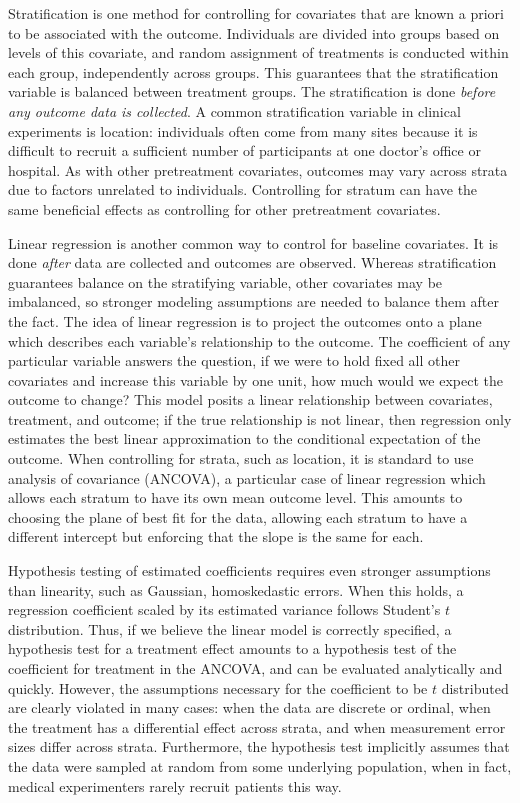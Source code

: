 \documentclass[11pt]{article}
\begin{document}
Stratification is one method for controlling for covariates that are known a priori to be associated with the outcome.
Individuals are divided into groups based on levels of this covariate, and random assignment of treatments is conducted within each group, independently across groups.
This guarantees that the stratification variable is balanced between treatment groups.
The stratification is done \textit{before any outcome data is collected}.
A common stratification variable in clinical experiments is location:
individuals often come from many sites because it is difficult to recruit a sufficient number of participants at one doctor's office or hospital.
As with other pretreatment covariates, outcomes may vary across strata due to factors unrelated to individuals.
Controlling for stratum can have the same beneficial effects as controlling for other pretreatment covariates.

Linear regression is another common way to control for baseline covariates.
It is done \textit{after} data are collected and outcomes are observed.
Whereas stratification guarantees balance on the stratifying variable, other covariates may be imbalanced, so stronger modeling assumptions are needed to balance them after the fact.
The idea of linear regression is to project the outcomes onto a plane which describes each variable's relationship to the outcome.
The coefficient of any particular variable answers the question, if we were to hold fixed all other covariates and increase this variable by one unit, how much would we expect the outcome to change?
This model posits a linear relationship between covariates, treatment, and outcome; 
if the true relationship is not linear, then regression only estimates the best linear approximation to the conditional expectation of the outcome.
When controlling for strata, such as location, it is standard to use analysis of covariance (ANCOVA), a particular case of linear regression which allows each stratum to have its own mean outcome level.
This amounts to choosing the plane of best fit for the data, allowing each stratum to have a different intercept but enforcing that the slope is the same for each.

Hypothesis testing of estimated coefficients requires even stronger assumptions than linearity, such as Gaussian, homoskedastic errors.
When this holds, a regression coefficient scaled by its estimated variance follows Student's $t$ distribution.
Thus, if we believe the linear model is correctly specified, a hypothesis test for a treatment effect amounts to a hypothesis test of the coefficient for treatment in the ANCOVA, and can be evaluated analytically and quickly.
However, the assumptions necessary for the coefficient to be $t$ distributed are clearly violated in many cases:
when the data are discrete or ordinal, when the treatment has a differential effect across strata, and when measurement error sizes differ across strata.
Furthermore, the hypothesis test implicitly assumes that the data were sampled at random from some underlying population, when in fact,
medical experimenters rarely recruit patients this way.
\end{document}
